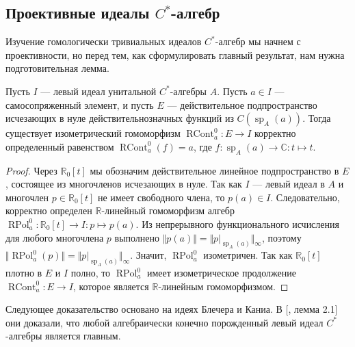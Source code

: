 
\subsection{Проективные идеалы 
    \texorpdfstring{$C^*$}{C*}-алгебр}\label{
        SubSectionProjectiveIdealsOfCStarAlgebras}

Изучение гомологически тривиальных идеалов $C^*$-алгебр мы начнем с
проективности, но перед тем, как сформулировать главный результат, нам нужна
подготовительная лемма.

\begin{lemma}\label{ContFuncCalcOnIdealOfCStarAlg} Пусть $I$ --- левый идеал
унитальной $C^*$-алгебры $A$. Пусть $a\in I$ --- самосопряженный элемент, и
пусть $E$ --- действительное подпространство исчезающих в нуле
действительнозначных функций из $C(\operatorname{sp}_A(a))$. Тогда существует
изометрический гомоморфизм $\operatorname{RCont}_a^0:E\to I$ корректно
определенный равенством $\operatorname{RCont}_a^0(f)=a$, где
$f:\operatorname{sp}_A(a)\to\mathbb{C}:t\mapsto t$.
\end{lemma}
\begin{proof} Через $\mathbb{R}_0[t]$ мы обозначим действительное линейное
подпространство в $E$, состоящее из многочленов исчезающих в нуле. Так как $I$
--- левый идеал в $A$ и многочлен $p\in\mathbb{R}_0[t]$ не имеет свободного
члена, то $p(a)\in I$. Следовательно, корректно определен $\mathbb{R}$-линейный
гомоморфизм алгебр $\operatorname{RPol}_a^0:\mathbb{R}_0[t]\to I:p\mapsto p(a)$.
Из непрерывного функционального исчисления для любого многочлена $p$ выполнено
$\Vert p(a)\Vert=\Vert p|_{\operatorname{sp}_A(a)}\Vert_\infty$, поэтому
$\Vert\operatorname{RPol}_a^0(p)\Vert=\Vert
p|_{\operatorname{sp}_A(a)}\Vert_\infty$. Значит, $\operatorname{RPol}_a^0$
изометричен. Так как $\mathbb{R}_0[t]$ плотно в $E$ и $I$ полно, то
$\operatorname{RPol}_a^0$ имеет изометрическое продолжение
$\operatorname{RCont}_a^0:E\to I$, которое является $\mathbb{R}$-линейным
гомоморфизмом. 
\end{proof}

Следующее доказательство основано на идеях Блечера и Каниа. В
[\cite{BleKanFinGenCStarAlgHilbMod}, лемма 2.1] они доказали, что любой
алгебраически конечно порожденный левый идеал $C^*$-алгебры является главным.  

